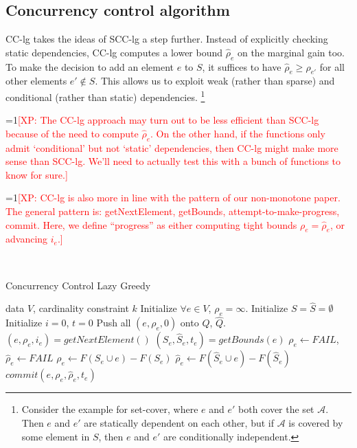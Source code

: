 \documentclass{article}
\newcommand{\Comments}{1}
\newcommand{\note}[2]{\ifnum\Comments=1\textcolor{#1}{#2}\fi}
\newcommand{\xinghao}[1]{\note{red}{[XP: #1]}}
\newcommand{\scclz}{SCC-lg}
\newcommand{\cclz}{CC-lg}
\begin{document}
\subsection{Concurrency control algorithm}
\cclz{} takes the ideas of \scclz{} a step further.
Instead of explicitly checking static dependencies, \cclz{} computes a lower bound $\widehat\rho_e$ on the marginal gain too.
To make the decision to add an element $e$ to $S$, it suffices to have $\widehat\rho_e \geq \rho_{e'}$ for all other elements $e' \not\in S$.
This allows us to exploit weak (rather than sparse) and conditional (rather than static) dependencies.
\footnote{
Consider the example for set-cover, where $e$ and $e'$ both cover the set $\mathcal{A}$.
Then $e$ and $e'$ are statically dependent on each other, but if $\mathcal{A}$ is covered by some element in $S$, then $e$ and $e'$ are conditionally independent.
}

\xinghao{The \cclz{} approach may turn out to be less efficient than \scclz{} because of the need to compute $\widehat\rho_e$.
On the other hand, if the functions only admit `conditional' but not `static' dependencies, then \cclz{} might make more sense than \scclz{}.
We'll need to actually test this with a bunch of functions to know for sure.}

\xinghao{\cclz{} is also more in line with the pattern of our non-monotone paper.
The general pattern is: getNextElement, getBounds, attempt-to-make-progress, commit.
Here, we define ``progress'' as either computing tight bounds $\rho_e = \widehat\rho_e$, or advancing $i_e$.}

~

\begin{algorithm}[tb]
  \caption{Concurrency Control Lazy Greedy}
  \label{alg:cclz}
\begin{algorithmic}[1]
   data $V$, cardinality constraint $k$
  \STATE Initialize $\forall e \in V$, $\rho_e = \infty$.
  \STATE Initialize $S = \widehat{S} = \emptyset$
  \STATE Initialize $i = 0$, $t = 0$
  \STATE Push all $(e, \rho_e, 0)$ onto $Q$, $\widehat{Q}$.
    \STATE $(e, \rho_e, i_e) = getNextElement()$
    \STATE $(S_e, \widehat{S}_e, t_e) = getBounds(e)$
      \STATE $\rho_e \leftarrow FAIL$, $\widehat\rho_e \leftarrow FAIL$
    \ELSE
      \STATE $\rho_e     \leftarrow F(S_e\cup e) - F(S_e)$
      \STATE $\widehat\rho_e \leftarrow F(\widehat{S}_e\cup e) - F(\widehat{S}_e)$
    \ENDIF
    \STATE $commit(e, \rho_e, \widehat\rho_e, t_e)$
  \ENDFOR
\end{algorithmic}
\end{algorithm}
\end{document}
